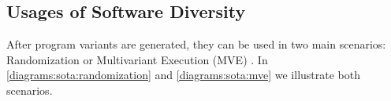 

\subsection{Usages of Software Diversity}

After program variants are generated, they can be used in two main scenarios: Randomization or Multivariant Execution (MVE) \cite{jackson}. In \autoref{diagrams:sota:randomization} and \autoref{diagrams:sota:mve} we illustrate both scenarios. 



